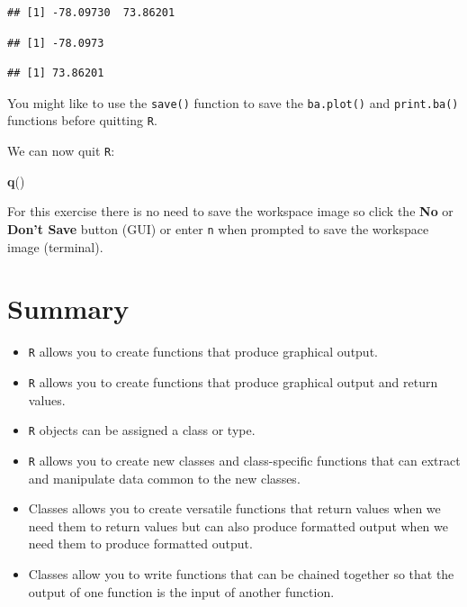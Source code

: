\documentclass[12pt,a4paper]{book}
\newenvironment{Shaded}{\begin{snugshade}}{\end{snugshade}}
\newcommand{\KeywordTok}[1]{\textcolor[rgb]{0.13,0.29,0.53}{\textbf{#1}}}
\newcommand{\NormalTok}[1]{#1}
\theoremstyle{definition}
\theoremstyle{definition}
\theoremstyle{definition}
\theoremstyle{remark}
\begin{document}
\begin{verbatim}
## [1] -78.09730  73.86201
\end{verbatim}

\begin{verbatim}
## [1] -78.0973
\end{verbatim}

\begin{verbatim}
## [1] 73.86201
\end{verbatim}

You might like to use the \texttt{save()} function to save the
\texttt{ba.plot()} and \texttt{print.ba()} functions before quitting
\texttt{R}.

We can now quit \texttt{R}:

\begin{Shaded}
\begin{Highlighting}[]
\KeywordTok{q}\NormalTok{()}
\end{Highlighting}
\end{Shaded}

For this exercise there is no need to save the workspace image so click
the \textbf{No} or \textbf{Don't Save} button (GUI) or enter \texttt{n}
when prompted to save the workspace image (terminal).

\hypertarget{summary-6}{%
\section{Summary}\label{summary-6}}

\begin{itemize}
\item
  \texttt{R} allows you to create functions that produce graphical
  output.
\item
  \texttt{R} allows you to create functions that produce graphical
  output and return values.
\item
  \texttt{R} objects can be assigned a class or type.
\item
  \texttt{R} allows you to create new classes and class-specific
  functions that can extract and manipulate data common to the new
  classes.
\item
  Classes allows you to create versatile functions that return values
  when we need them to return values but can also produce formatted
  output when we need them to produce formatted output.
\item
  Classes allow you to write functions that can be chained together so
  that the output of one function is the input of another function.
\end{itemize}
\end{document}
